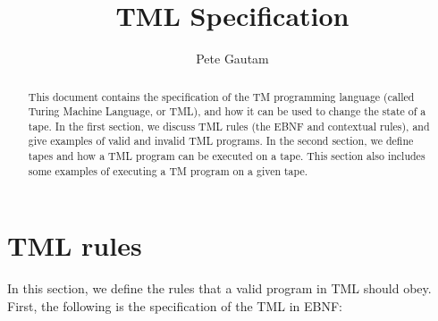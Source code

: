 \documentclass{article}
\title{TML Specification}
\author{Pete Gautam}
\theoremstyle{definition}
\begin{document}
    \maketitle
    \begin{abstract}
        This document contains the specification of the TM programming language (called Turing Machine Language, or TML), and how it can be used to change the state of a tape. In the first section, we discuss TML rules (the EBNF and contextual rules), and give examples of valid and invalid TML programs. In the second section, we define tapes and how a TML program can be executed on a tape. This section also includes some examples of executing a TM program on a given tape.
    \end{abstract}

    \section{TML rules}
    In this section, we define the rules that a valid program in TML should obey. First, the following is the specification of the TML in EBNF:
\end{document}

